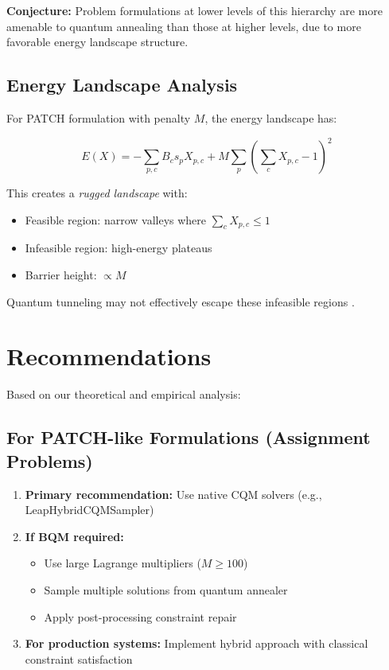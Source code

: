 \documentclass[11pt,a4paper]{article}
\begin{document}
\textbf{Conjecture:} Problem formulations at lower levels of this hierarchy are more amenable to quantum annealing than those at higher levels, due to more favorable energy landscape structure.

\subsection{Energy Landscape Analysis}

For PATCH formulation with penalty $M$, the energy landscape has:

\begin{equation}
E(X) = -\sum_{p,c} B_c s_p X_{p,c} + M \sum_p \left(\sum_c X_{p,c} - 1\right)^2
\end{equation}

This creates a \emph{rugged landscape} with:
\begin{itemize}
    \item Feasible region: narrow valleys where $\sum_c X_{p,c} \leq 1$
    \item Infeasible region: high-energy plateaus
    \item Barrier height: $\propto M$
\end{itemize}

Quantum tunneling may not effectively escape these infeasible regions \cite{sharma2024hybrid}.

\section{Recommendations}

Based on our theoretical and empirical analysis:

\subsection{For PATCH-like Formulations (Assignment Problems)}

\begin{enumerate}
    \item \textbf{Primary recommendation:} Use native CQM solvers (e.g., LeapHybridCQMSampler)
    \item \textbf{If BQM required:} 
        \begin{itemize}
            \item Use large Lagrange multipliers ($M \geq 100$)
            \item Sample multiple solutions from quantum annealer
            \item Apply post-processing constraint repair
        \end{itemize}
    \item \textbf{For production systems:} Implement hybrid approach with classical constraint satisfaction
\end{enumerate}
\end{document}

